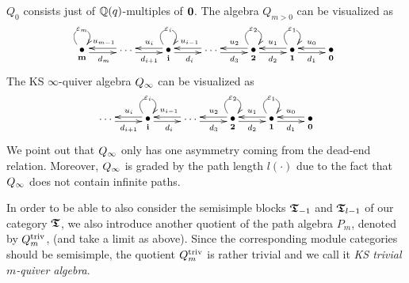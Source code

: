\begin{ex}\label{ex-quiver}
$Q_0$ consists just of $\mathbb{Q}(q)$-multiples of 
$\boldsymbol{0}$. The algebra $Q_{m>0}$ can be visualized as
\[
\xymatrix{
  \raisebox{0.1cm}{\xy(0,0)*{\bullet};(0,-2.5)*{\scriptstyle \bbm};\endxy} \ar@(ul,ur)|{\varepsilon_m} \ar@<-2pt>[r]_{d_{m}} & \cdots \ar@<-2pt>[l]_{u_{m-1}}\ar@<-2pt>[r]_/+0.2em/{d_{i+1}} &  \raisebox{0.1cm}{\xy(0,0)*{\bullet};(0,-2.5)*{\scriptstyle \bbi};\endxy} \ar@(ul,ur)|{\varepsilon_i} \ar@<-2pt>[l]_/-0.2em/{u_{i}}\ar@<-2pt>[r]_{d_{i}} & \cdots \ar@<-2pt>[l]_{u_{i-1}}\ar@<-2pt>[r]_/+0.2em/{d_{3}} & \raisebox{0.1cm}{\xy(0,0)*{\bullet};(0,-2.5)*{\scriptstyle \bbt};\endxy} \ar@(ul,ur)|{\varepsilon_2} \ar@<-2pt>[l]_/-0.2em/{u_{2}}\ar@<-2pt>[r]_{d_{2}} & \raisebox{0.1cm}{\xy(0,0)*{\bullet};(0,-2.5)*{\scriptstyle \bbo};\endxy} \ar@(ul,ur)|{\varepsilon_1} \ar@<-2pt>[l]_{u_{1}}\ar@<-2pt>[r]_{d_{1}} & \raisebox{0.1cm}{\xy(0,0)*{\bullet};(0,-2.5)*{\scriptstyle \bbz};\endxy}  \ar@<-2pt>[l]_{u_0}\\
}
\]
The KS $\infty$-quiver algebra $Q_{\infty}$ can be visualized as
\[
\xymatrix{
   \cdots\ar@<-2pt>[r]_/+0.2em/{d_{i+1}} &  \raisebox{0.1cm}{\xy(0,0)*{\bullet};(0,-2.5)*{\scriptstyle \bbi};\endxy} \ar@(ul,ur)|{\varepsilon_i} \ar@<-2pt>[l]_/-0.2em/{u_{i}}\ar@<-2pt>[r]_{d_{i}} & \cdots \ar@<-2pt>[l]_{u_{i-1}}\ar@<-2pt>[r]_/+0.2em/{d_{3}} & \raisebox{0.1cm}{\xy(0,0)*{\bullet};(0,-2.5)*{\scriptstyle \bbt};\endxy} \ar@(ul,ur)|{\varepsilon_2} \ar@<-2pt>[l]_/-0.2em/{u_{2}}\ar@<-2pt>[r]_{d_{2}} & \raisebox{0.1cm}{\xy(0,0)*{\bullet};(0,-2.5)*{\scriptstyle \bbo};\endxy} \ar@(ul,ur)|{\varepsilon_1} \ar@<-2pt>[l]_{u_{1}}\ar@<-2pt>[r]_{d_{1}} & \raisebox{0.1cm}{\xy(0,0)*{\bullet};(0,-2.5)*{\scriptstyle \bbz};\endxy}  \ar@<-2pt>[l]_{u_0}\\
}
\]
We point out that $Q_{\infty}$ only has one 
asymmetry coming from the dead-end 
relation. Moreover, $Q_{\infty}$ is graded by the 
path length $l(\cdot)$ due to the fact 
that $Q_{\infty}$ does not contain infinite paths.
\end{ex}



In order to be able to also consider the 
semisimple blocks $\boldsymbol{\mathfrak{T}}_{-1}$ and $\boldsymbol{\mathfrak{T}}_{l-1}$ of 
our category $\boldsymbol{\mathfrak{T}}$, we also introduce another 
quotient of the path algebra $P_m$, denoted 
by $Q_m^{\mathrm{triv}}$, (and take a limit as above). Since 
the corresponding module categories should be 
semisimple, the quotient $Q_m^{\mathrm{triv}}$ is rather trivial 
and we call it \textit{KS trivial $m$-quiver algebra}.




